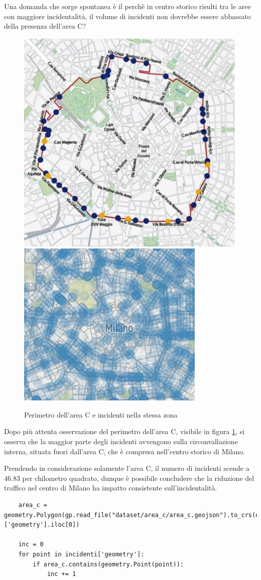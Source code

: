 \documentclass[a4paper]{report}
\begin{document}
Una domanda che sorge spontanea è il perchè in centro storico risulti tra le aree con maggiore 
incidentalità, il volume di incidenti non dovrebbe essere abbassato della presenza dell'area C?

\begin{figure}
    \includegraphics[width=0.48\linewidth]{../dataset/area_c/perimetro_area_c.png}
    \includegraphics[width=0.52\linewidth]{../src/area_c/area_c_incidenti.png}
    \caption{Perimetro dell'area C e incidenti nella stessa zona}
    \label{fig:perimetro-area-c}
\end{figure}

Dopo più attenta osservazione del perimetro dell'area C, visibile in figura \ref{fig:perimetro-area-c}, 
si osserva che la maggior parte degli incidenti avvengono sulla circonvallazione interna, 
situata fuori dall'area C, che è compresa nell'centro storico di Milano.

Prendendo in considerazione solamente l'area C, il numero di incidenti scende a $46.83$ 
per chilometro quadrato, dunque è possibile concludere che la riduzione del traffico nel 
centro di Milano ha impatto consistente sull'incidentalità.

\begin{lstlisting}
    area_c = geometry.Polygon(gp.read_file("dataset/area_c/area_c.geojson").to_crs(epsg=3857)['geometry'].iloc[0])

    inc = 0
    for point in incidenti['geometry']: 
        if area_c.contains(geometry.Point(point)): 
            inc += 1
\end{lstlisting}
\end{document}

